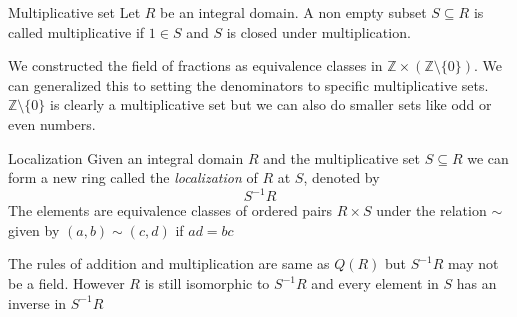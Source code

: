 \documentclass[16pt,a4paper]{article}
\theoremstyle{definition}
\newcommand{\Z}{\mathbb{Z}}
\begin{document}
\begin{defn}{Multiplicative set}{}
Let $R$ be an integral domain. A non empty subset $S\subseteq R$ is called multiplicative if $1\in S$ and $S$ is closed under multiplication.   
\end{defn}
We constructed the field of fractions as equivalence classes in $\Z\times (\Z\setminus \{0\})$. We can generalized this to setting the denominators to specific multiplicative sets.  $\Z\setminus \{0\}$ is clearly a multiplicative set but we can also do smaller sets like odd or even numbers. 
\\
\begin{defn}{Localization}{}
Given an integral domain $R$ and the multiplicative set $S\subseteq R$ we can form a new ring called the \emph{localization} of $R$ at $S$, denoted by 
\[S^{-1}R\]
The elements are equivalence classes of ordered pairs $R\times S$ under the relation $\sim$ given by $(a,b)\sim (c,d)$ if $ad = bc$
\end{defn}
The rules of addition and multiplication are same as $Q(R)$ but $S^{-1}R$ may not be a field. However $R$ is still isomorphic to $S^{-1}R$ and every element in $S$ has an inverse in $S^{-1}R$ 
\end{document}
